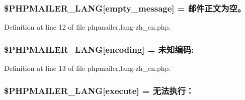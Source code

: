 \subsubsection[{\texorpdfstring{\$\+P\+H\+P\+M\+A\+I\+L\+E\+R\+\_\+\+L\+A\+NG}{$PHPMAILER_LANG}}]{\setlength{\rightskip}{0pt plus 5cm}\$P\+H\+P\+M\+A\+I\+L\+E\+R\+\_\+\+L\+A\+NG\mbox{[}\textquotesingle{}empty\+\_\+message\textquotesingle{}\mbox{]} = \textquotesingle{}邮件正文为空。\textquotesingle{}}\hypertarget{phpmailer_8lang-zh__cn_8php_a33772099f637c9d6c2cd7425e0e37fed}{}\label{phpmailer_8lang-zh__cn_8php_a33772099f637c9d6c2cd7425e0e37fed}


Definition at line 12 of file phpmailer.\+lang-\/zh\+\_\+cn.\+php.

\subsubsection[{\texorpdfstring{\$\+P\+H\+P\+M\+A\+I\+L\+E\+R\+\_\+\+L\+A\+NG}{$PHPMAILER_LANG}}]{\setlength{\rightskip}{0pt plus 5cm}\$P\+H\+P\+M\+A\+I\+L\+E\+R\+\_\+\+L\+A\+NG\mbox{[}\textquotesingle{}encoding\textquotesingle{}\mbox{]} = \textquotesingle{}未知编码\+: \textquotesingle{}}\hypertarget{phpmailer_8lang-zh__cn_8php_a817f7283f3d54c970a0c10305cc668cc}{}\label{phpmailer_8lang-zh__cn_8php_a817f7283f3d54c970a0c10305cc668cc}


Definition at line 13 of file phpmailer.\+lang-\/zh\+\_\+cn.\+php.

\subsubsection[{\texorpdfstring{\$\+P\+H\+P\+M\+A\+I\+L\+E\+R\+\_\+\+L\+A\+NG}{$PHPMAILER_LANG}}]{\setlength{\rightskip}{0pt plus 5cm}\$P\+H\+P\+M\+A\+I\+L\+E\+R\+\_\+\+L\+A\+NG\mbox{[}\textquotesingle{}execute\textquotesingle{}\mbox{]} = \textquotesingle{}无法执行：\textquotesingle{}}\hypertarget{phpmailer_8lang-zh__cn_8php_a668217a9563a168f30f2a8548b6ed5a9}{}\label{phpmailer_8lang-zh__cn_8php_a668217a9563a168f30f2a8548b6ed5a9}


